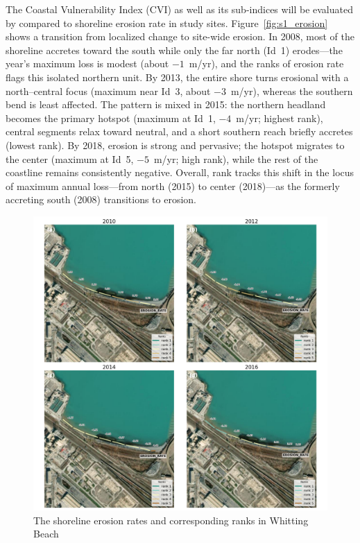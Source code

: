 The Coastal Vulnerability Index (CVI) as well as its sub-indices will be
evaluated by compared to shoreline erosion rate in study sites.
Figure~\ref{fig:s1_erosion} shows a transition from localized change to
site-wide erosion. In 2008, most of the shoreline accretes toward the south
while only the far north (Id~1) erodes—the year’s maximum loss is modest (about
$-1$~m/yr), and the ranks of erosion rate flags this isolated northern unit. By
2013, the entire shore turns erosional with a north–central focus (maximum near
Id~3, about $-3$~m/yr), whereas the southern bend is least affected. The pattern
is mixed in 2015: the northern headland becomes the primary hotspot (maximum at
Id~1, $ -4$~m/yr; highest rank), central segments relax toward neutral,
and a short southern reach briefly accretes (lowest rank). By 2018, erosion is
strong and pervasive; the hotspot migrates to the center (maximum at Id~5,
$ -5$~m/yr; high rank), while the rest of the coastline remains
consistently negative. Overall, rank tracks this shift in the locus of maximum
annual loss—from north (2015) to center (2018)—as the formerly accreting south
(2008) transitions to erosion.

\begin{figure}[htbp]
  \centering
  \includegraphics[width=1\textwidth]{chapter5/resources/site2_erosion.png}
  \caption{The shoreline erosion rates and corresponding ranks in Whitting Beach}
  \label{fig:s2_erosion}
\end{figure}

